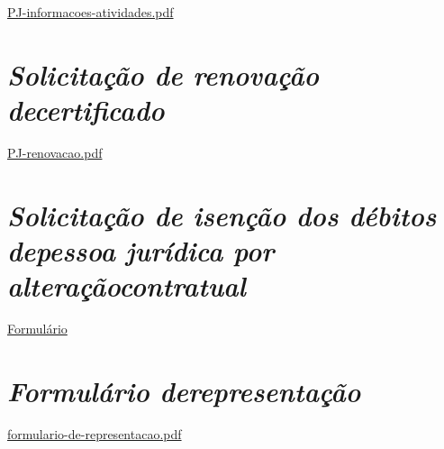 \href{file:///C:/Users/angelo.cuissi/Documents/cuissi/caderno/revisão/202406/carta-de-servicos/carta-preparacao-de-original/PJ-informacoes-atividades.pdf}{PJ-informacoes-atividades.pdf}

\chapter{\texorpdfstring{\emph{Solicitação de renovação decertificado}}{Solicitação de renovação de certificado}}

\href{file:///C:/Users/angelo.cuissi/Documents/cuissi/caderno/revisão/202406/carta-de-servicos/carta-preparacao-de-original/PJ-renovacao.pdf}{PJ-renovacao.pdf}

\chapter{\texorpdfstring{\emph{Solicitação de isenção dos débitos depessoa jurídica por alteraçãocontratual}}{Solicitação de isenção dos débitos de pessoa jurídica por alteração contratual}}

\href{file:///C:/Users/angelo.cuissi/Documents/cuissi/caderno/revisão/202406/carta-de-servicos/carta-preparacao-de-original/PJ-isencao.pdf}{Formulário}

\chapter{\texorpdfstring{\emph{Formulário derepresentação}}{Formulário de representação}}

\href{file:///C:/Users/angelo.cuissi/Documents/cuissi/caderno/revisão/202406/carta-de-servicos/carta-preparacao-de-original/formulario-de-representacao.pdf}{formulario-de-representacao.pdf}

